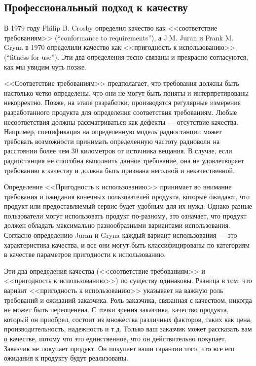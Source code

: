 \documentclass{../../text-style}
\begin{document}
\subsection{Профессиональный подход к качеству}

В 1979 году Philip B. Crosby определил качество как <<соответствие требованиям>> (``conformance to requirements''), а J.M. Juran и Frank M. Gryna в 1970 определили качество как <<пригодность к использованию>> (``fitness for use''). Эти два определения тесно связаны и прекрасно согласуются, как мы увидим чуть позже.

<<Соответствие требованиям>> предполагает, что требования должны быть настолько четко определены, что они не могут быть поняты и интерпретированы некорректно. Позже, на этапе разработки, производятся регулярные измерения разработанного продукта для определения соответствия требованиям. Любые несоответствия должны рассматриваться как дефекты --- отсутствие качества. Например, спецификация на определенную модель радиостанции может требовать возможности принимать определенную частоту радиоволн на расстоянии более чем 30 километров от источника вещания. В случае, если радиостанция не способна выполнить данное требование, она не удовлетворяет требованию к качеству и должна быть признана негодной и некачественной.

Определение <<Пригодность к использованию>> принимает во внимание требования и ожидания конечных пользователей продукта, которые ожидают, что продукт или предоставляемый сервис будет удобным для их нужд. Однако разные пользователи могут использовать продукт по-разному, это означает, что продукт должен обладать максимально разнообразными вариантами использования. Согласно определению Juran и Gryna каждый вариант использования --- это характеристика качества, и все они могут быть классифицированы по категориям в качестве параметров пригодности к использованию.

Эти два определения качества (<<соответствие требованиям>> и <<пригодность к использованию>>) по существу одинаковы. Разница в том, что вариант <<пригодность к использованию>> указывает на важную роль требований и ожиданий заказчика. Роль заказчика, связанная с качеством, никогда не может быть переоценена. С точки зрения заказчика, качество продукта, который он приобрел, состоит из множества различных факторов, таких как цена, производительность, надежность и т.д. Только ваш заказчик может рассказать вам о качестве, потому что это единственное, что он действительно покупает. Заказчик не покупает продукт. Он покупает ваши гарантии того, что все его ожидания к продукту будут реализованы.
\end{document}
